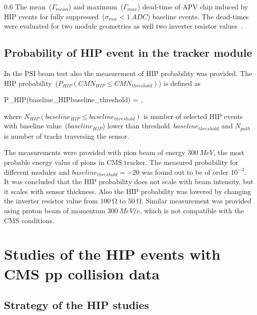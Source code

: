                  {0.6}       %
                 {The mean~($\Gamma_{mean}$) and maximum~($\Gamma_{max}$) dead-time of APV chip induced by HIP events for fully suppressed~($\sigma_{raw}<1~ADC$) baseline events. The dead-times were evaluated for two module geometries as well two inverter resistor values~\cite{Bainbridge:2004jc}.} %


\subsection{Probability of HIP event in the tracker module}

In the PSI beam test also the measurement of HIP probability was provided. The HIP probability~($P_{HIP}(CMN_{HIP}\leq CMN_{threshold})$) is defined as 

{
P_{HIP}(baseline_{HIP}\leq baseline_{threshold}) = ,
}

where $N_{HIP}(baseline_{HIP}\leq baseline_{threshold})$ is number of selected HIP events with baseline value~($baseline_{HIP}$) lower than threshold~$baseline_{threshold}$ and $N_{path}$ is number of tracks traversing the sensor.

The measurements were provided with pion beam of energy $300~MeV$, the most probable energy value of pions in CMS tracker. The measured probability for different modules and $baseline_{threshold}=-20$ was found out to be of order $10^{-3}$. It was concluded that the HIP probability does not scale with beam intensity, but it scales with sensor thickness. Also the HIP probability was lowered by changing the inverter resistor value from $100~\mathrm{\Omega}$ to  $50~\mathrm{\Omega}$. Similar measurement was provided using proton beam of momentum $300~MeV/c$, which is not compatible with the CMS conditions.


\section{Studies of the HIP events with CMS pp collision data}

\subsection{Strategy of the HIP studies}

